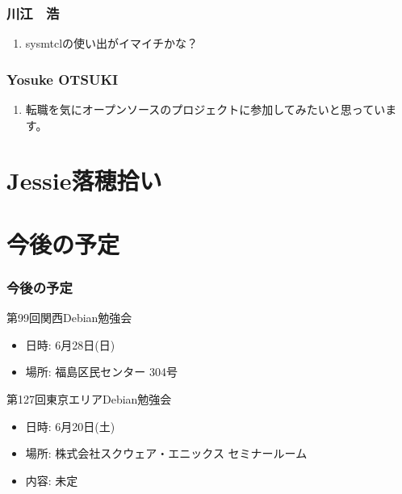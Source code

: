 \documentclass[cjk,dvipdfmx,10pt,compress,%
hyperref={bookmarks=true,bookmarksnumbered=true,bookmarksopen=false,%
colorlinks=false,%
pdftitle={第 98 回 関西 Debian 勉強会},%
pdfauthor={倉敷・のがた・佐々木・かわだ},%
pdfsubject={資料},%
}]{beamer}
\begin{document}
\begin{frame}
  \frametitle{ 川江　浩 }
  \begin{enumerate}
  \item sysmtclの使い出がイマイチかな？
  \end{enumerate}
\end{frame}

\begin{frame}
  \frametitle{ Yosuke OTSUKI }
  \begin{enumerate}
  \item 転職を気にオープンソースのプロジェクトに参加してみたいと思っています。
  \end{enumerate}
\end{frame}


\section{Jessie落穂拾い}


\section{今後の予定}
\begin{frame}[fragile]
\frametitle{今後の予定}

\begin{block}{第99回関西Debian勉強会}
  \begin{itemize}
  \item 日時: 6月28日(日)
  \item 場所: 福島区民センター 304号
  \end{itemize}
\end{block}

\begin{block}{第127回東京エリアDebian勉強会}
  \begin{itemize}
  \item 日時: 6月20日(土)
  \item 場所: 株式会社スクウェア・エニックス セミナールーム
  \item 内容: 未定
  \end{itemize}
\end{block}

\end{frame}

\takahashi[50]{  }
\end{document}
